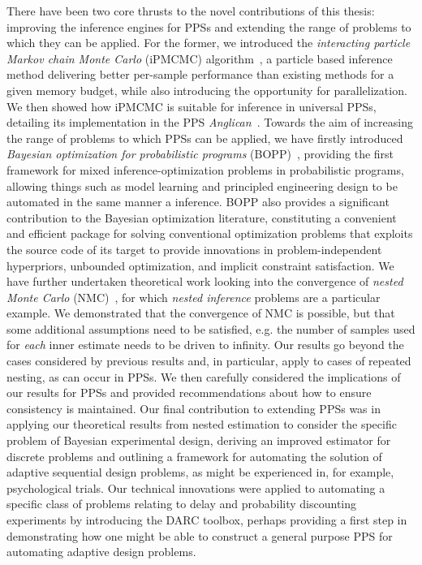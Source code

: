 There have been two core thrusts to the novel contributions of this thesis: improving the inference engines
for PPSs and extending the range of problems to which they can be applied.  For
the former, we introduced the \emph{interacting particle Markov chain Monte Carlo} (iPMCMC)
algorithm~\citep{rainforth2016interacting}, a particle based inference method delivering
better per-sample performance than existing methods for a given memory budget, while also introducing the opportunity for
parallelization.  We then showed how iPMCMC is suitable for inference in universal PPSs, detailing its implementation
in the PPS \emph{Anglican}~\citep{tolpin2016design}.  Towards the aim of increasing the range of problems 
to which PPSs can be applied, 
we have firstly introduced \emph{Bayesian optimization for probabilistic 
	programs} (BOPP)~\citep{rainforth2016bayesian}, providing
the first framework for mixed inference-optimization problems in probabilistic programs, allowing things
such as model learning and principled engineering design to be automated in the same manner a inference.
BOPP also provides a significant contribution to the Bayesian optimization literature, constituting a
convenient and efficient package for solving conventional optimization problems that exploits the
source code of its target to provide innovations in problem-independent hyperpriors, unbounded
 optimization, and implicit constraint satisfaction.
We have further undertaken theoretical work looking into the convergence of \emph{nested Monte Carlo} (NMC)~\citep{rainforth2017pitfalls}, for which \emph{nested inference} problems are a particular example.
We demonstrated that the convergence
of NMC is possible, but that some additional assumptions need
to be satisfied, e.g. the number of samples used for \emph{each} inner estimate needs to be driven
to infinity.  Our results go beyond the cases considered
by previous results and, in particular, apply to cases of repeated nesting, as can occur in PPSs.
We then carefully considered the implications of our results for PPSs and provided recommendations
about how to ensure consistency is maintained.  Our final contribution to extending PPSs was in
applying our theoretical results from nested estimation to consider the specific problem of Bayesian
experimental design, deriving an improved estimator for discrete problems and outlining a framework
for automating the solution of adaptive sequential design problems, as might be experienced in, for example,
psychological trials.  Our technical innovations were applied to automating
a specific class of problems relating to delay and probability discounting experiments by
introducing the DARC toolbox, perhaps providing a first step in demonstrating how one might
be able to construct a general purpose PPS for automating adaptive design problems.

